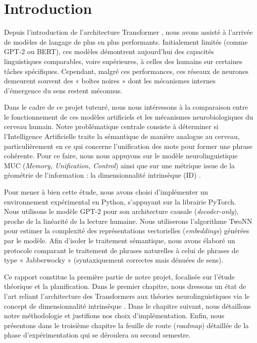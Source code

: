 \chapter*{Introduction}

Depuis l'introduction de l'architecture Transformer \cite{vaswani2017attention}, nous avons assisté à l'arrivée de modèles de langage de plus en plus performants. Initialement limités (comme GPT-2 ou BERT), ces modèles démontrent aujourd'hui des capacités linguistiques comparables, voire supérieures, à celles des humains sur certaines tâches spécifiques. Cependant, malgré ces performances, ces réseaux de neurones demeurent souvent des « boîtes noires » dont les mécanismes internes d'émergence du sens restent méconnus.

Dans le cadre de ce projet tuteuré, nous nous intéressons à la comparaison entre le fonctionnement de ces modèles artificiels et les mécanismes neurobiologiques du cerveau humain. Notre problématique centrale consiste à déterminer si l'Intelligence Artificielle traite la sémantique de manière analogue au cerveau, particulièrement en ce qui concerne l'unification des mots pour former une phrase cohérente. Pour ce faire, nous nous appuyons sur le modèle neurolinguistique MUC (\textit{Memory, Unification, Control}) \cite{hagoort2013memory} ainsi que sur une métrique issue de la géométrie de l'information : la dimensionnalité intrinsèque (ID) \cite{facco2017estimating, ansuini2019intrinsic}.

Pour mener à bien cette étude, nous avons choisi d'implémenter un environnement expérimental en Python, s'appuyant sur la librairie PyTorch. Nous utilisons le modèle GPT-2 pour son architecture causale (\textit{decoder-only}), proche de la linéarité de la lecture humaine. Nous utiliserons l'algorithme TwoNN \cite{facco2017estimating} pour estimer la complexité des représentations vectorielles (\textit{embeddings}) générées par le modèle. Afin d'isoler le traitement sémantique, nous avons élaboré un protocole comparant le traitement de phrases naturelles à celui de phrases de type « Jabberwocky » (syntaxiquement correctes mais dénuées de sens).

Ce rapport constitue la première partie de notre projet, focalisée sur l'étude théorique et la planification. Dans le premier chapitre, nous dressons un état de l'art reliant l'architecture des Transformers aux théories neurolinguistiques via le concept de dimensionnalité intrinsèque \cite{recanatesi2021predictive}. Dans le chapitre suivant, nous détaillons notre méthodologie et justifions nos choix d'implémentation. Enfin, nous présentons dans le troisième chapitre la feuille de route (\textit{roadmap}) détaillée de la phase d'expérimentation qui se déroulera au second semestre.
